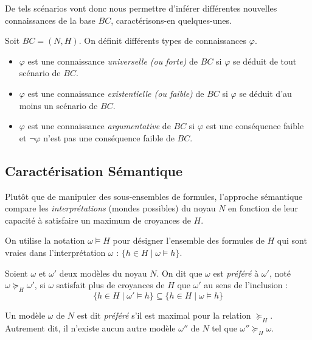 De tels scénarios vont donc nous permettre d'inférer différentes nouvelles connaissances de 
la base $BC$, caractérisons-en quelques-unes. 

\begin{definition}[Conséquences]
    Soit $BC = (N, H)$. On définit différents types de connaissances $ \varphi$. 
    \begin{itemize}
        \item $ \varphi$ est une connaissance \emph{universelle (ou forte)} de $BC$ si $ \varphi$ 
        se déduit de tout scénario de $BC$. 
        \item $ \varphi$ est une connaissance \emph{existentielle (ou faible)} de $BC$ si $ \varphi$ 
        se déduit d'au moins un scénario de $BC$. 
        \item $ \varphi$ est une connaissance \emph{argumentative} de $BC$ si $ \varphi$ 
        est une conséquence faible et $ \lnot \varphi$ n'est pas une conséquence faible de $ BC$. 
    \end{itemize}
\end{definition}



\subsection{Caractérisation Sémantique}

Plutôt que de manipuler des sous-ensembles de formules, l'approche sémantique compare les \emph{interprétations} 
(mondes possibles) du noyau $N$ en fonction de leur capacité à satisfaire un maximum de croyances de $H$.

On utilise la notation $\omega \models H$ pour désigner l'ensemble des formules de $H$ qui sont vraies dans 
l'interprétation $\omega$ : $\{ h \in H \mid \omega \models h \}$.

\begin{definition}
    Soient $\omega$ et $\omega'$ deux modèles du noyau $N$. On dit que $\omega$ est \emph{préféré} à $\omega'$, 
    noté $\omega \succeq_H \omega'$, si $\omega$ satisfait plus de croyances de $H$ que $\omega'$ au sens de l'inclusion :
        $$ \{ h \in H \mid \omega' \models h \} \subseteq \{ h \in H \mid \omega \models h \} $$
\end{definition}

\begin{definition}
    Un modèle $\omega$ de $N$ est dit \emph{préféré} s'il est maximal pour la relation $\succeq_H$. Autrement dit, il 
    n'existe aucun autre modèle $\omega''$ de $N$ tel que $\omega'' \succeq_H \omega$.
\end{definition}

